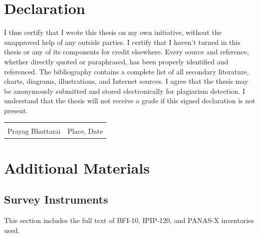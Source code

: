 \documentclass{DESSThesis}
\begin{document}
\printbibliography

\chapter{Declaration}
I thus certify that I wrote this thesis on my own initiative, without the unapproved help of any outside parties. I certify that I haven't turned in this thesis or any of its components for credit elsewhere. Every source and reference, whether directly quoted or paraphrased, has been properly identified and referenced. The bibliography contains a complete list of all secondary literature, charts, diagrams, illustrations, and Internet sources. I agree that the thesis may be anonymously submitted and stored electronically for plagiarism detection. I understand that the thesis will not receive a grade if this signed declaration is not present.

\vspace{0.5in}
\noindent\begin{tabular}{ll}
	\makebox[2in]{\hrulefill} & \makebox[2in]{\hrulefill}\\
	Prayag Bhattarai & Place, Date\\
\end{tabular}


\appendix
\chapter{Additional Materials}

\section{Survey Instruments}
This section includes the full text of BFI-10, IPIP-120, and PANAS-X inventories used.
\end{document}
